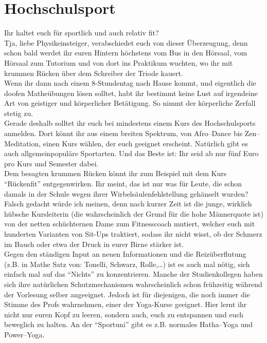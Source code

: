 \section{Hochschulsport}
Ihr haltet euch für sportlich und auch relativ fit?\\
Tja, liebe Physikeinsteiger, verabschiedet euch von dieser Überzeugung, denn schon bald werdet ihr euren Hintern höchstens vom Bus in den Hörsaal, vom Hörsaal zum Tutorium und von dort ins Praktikum wuchten, wo ihr mit krummen Rücken über dem Schreiber der Triode kauert.\\
Wenn ihr dann nach einem 8-Stundentag nach Hause kommt, und eigentlich die doofen Matheübungen lösen solltet, habt ihr bestimmt keine Lust auf irgendeine Art von geistiger und körperlicher Betätigung. So nimmt der körperliche Zerfall stetig zu.\\
Gerade deshalb solltet ihr euch bei mindestens einem Kurs des Hochschulsports anmelden. Dort könnt ihr aus einem breiten Spektrum, von Afro--Dance bis Zen--Meditation, einen Kurs wählen, der euch geeignet erscheint.
Natürlich gibt es auch allgemeinpopuläre Sportarten. Und das Beste ist: Ihr seid ab nur fünf Euro pro Kurs und Semester dabei.\\
Dem besagten krummen Rücken könnt ihr zum Beispiel mit dem Kurs \enquote{Rückenfit} entgegenwirken. Ihr meint, das ist nur was für Leute, die schon damals in der Schule wegen ihrer Wirbelsäulenfehlstellung gehänselt wurden? Falsch gedacht würde ich meinen, denn nach kurzer Zeit ist die junge, wirklich hübsche Kursleiterin (die wahrscheinlich der Grund für die hohe Männerquote ist) von der netten schüchternen Dame zum Fitnesscoach mutiert, welcher euch mit hunderten Varianten von Sit-Ups traktiert, sodass ihr nicht wisst, ob der Schmerz im Bauch oder etwa der Druck in eurer Birne stärker ist.\\
Gegen den ständigen Input an neuen Informationen und die Reizüberflutung (z.B. in Mathe Satz von: Tonelli, Schwarz, Rolle,\ldots ) ist es auch mal nötig, sich einfach mal auf das \enquote{Nichts} zu konzentrieren. Manche der Studienkollegen haben sich ihre natürlichen Schutzmechanismen wahrscheinlich schon frühzeitig während der Vorlesung selber angeeignet. Jedoch ist für diejenigen, die noch immer die Stimme des Profs wahrnehmen, einer der Yoga-Kurse geeignet. Hier lernt ihr nicht nur euren Kopf zu leeren, sondern auch, euch zu entspannen und euch beweglich zu halten.
An der \enquote{Sportuni} gibt es z.B. normales Hatha--Yoga und Power--Yoga.\\
